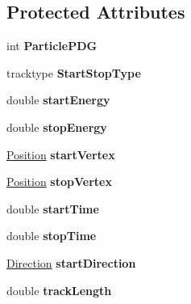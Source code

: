 \subsection*{Protected Attributes}
\begin{DoxyCompactItemize}
\item 
\hypertarget{classParticle_afb1a0b4ded7006e229d0a3c572874696}{int {\bfseries Particle\-P\-D\-G}}\label{classParticle_afb1a0b4ded7006e229d0a3c572874696}

\item 
\hypertarget{classParticle_a2e4d914cad53144592a6b781af9dae0f}{tracktype {\bfseries Start\-Stop\-Type}}\label{classParticle_a2e4d914cad53144592a6b781af9dae0f}

\item 
\hypertarget{classParticle_a5423d92a78e23c3dcd26ebfbb690692b}{double {\bfseries start\-Energy}}\label{classParticle_a5423d92a78e23c3dcd26ebfbb690692b}

\item 
\hypertarget{classParticle_af1ba1bafa350dda9a76c7ac3c7f7755b}{double {\bfseries stop\-Energy}}\label{classParticle_af1ba1bafa350dda9a76c7ac3c7f7755b}

\item 
\hypertarget{classParticle_a7dfdb772edd79ee66ffcd57b9b87f122}{\hyperlink{classPosition}{Position} {\bfseries start\-Vertex}}\label{classParticle_a7dfdb772edd79ee66ffcd57b9b87f122}

\item 
\hypertarget{classParticle_a91ecd35a7caa52c7c8cfb07ef7941332}{\hyperlink{classPosition}{Position} {\bfseries stop\-Vertex}}\label{classParticle_a91ecd35a7caa52c7c8cfb07ef7941332}

\item 
\hypertarget{classParticle_a07531fe11b42a3876addaddc60cfba5c}{double {\bfseries start\-Time}}\label{classParticle_a07531fe11b42a3876addaddc60cfba5c}

\item 
\hypertarget{classParticle_a544f4cc1bdb91fdb4abc974fcb2f8fd4}{double {\bfseries stop\-Time}}\label{classParticle_a544f4cc1bdb91fdb4abc974fcb2f8fd4}

\item 
\hypertarget{classParticle_a1c54e0a9a6968eb1ead66e7c5121f264}{\hyperlink{classDirection}{Direction} {\bfseries start\-Direction}}\label{classParticle_a1c54e0a9a6968eb1ead66e7c5121f264}

\item 
\hypertarget{classParticle_ae125283518203a3eb9f85a811a48139b}{double {\bfseries track\-Length}}\label{classParticle_ae125283518203a3eb9f85a811a48139b}

\end{DoxyCompactItemize}
